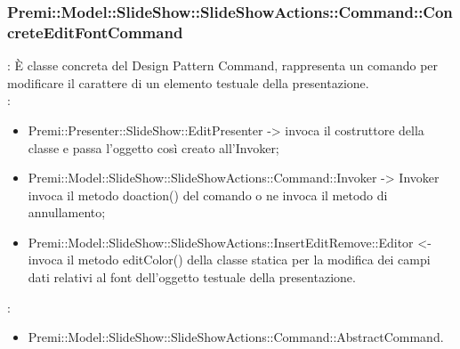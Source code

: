 {                    \subsubsection{Premi::Model::SlideShow::SlideShowActions::Command::ConcreteEditFontCommand}{
				\textbf{\tipo}: È classe concreta del Design Pattern Command, rappresenta un comando per modificare il carattere di un elemento testuale della presentazione.\\	
				\textbf{\relaz}: 
				\begin{itemize}
					\item Premi::Presenter::SlideShow::EditPresenter -> invoca il costruttore della classe e passa l’oggetto così creato all’Invoker;
					\item Premi::Model::SlideShow::SlideShowActions::Command::Invoker -> Invoker invoca il metodo doaction() del comando o ne invoca il metodo di annullamento;
                    \item Premi::Model::SlideShow::SlideShowActions::InsertEditRemove::Editor <- invoca il metodo editColor() della classe statica per la modifica dei campi dati relativi al font dell'oggetto testuale della presentazione.
				\end{itemize}	
                \textbf{\base}: 
                    \begin{itemize}
                    \item Premi::Model::SlideShow::SlideShowActions::Command::AbstractCommand.
                    \end{itemize}
                    }
                    }
